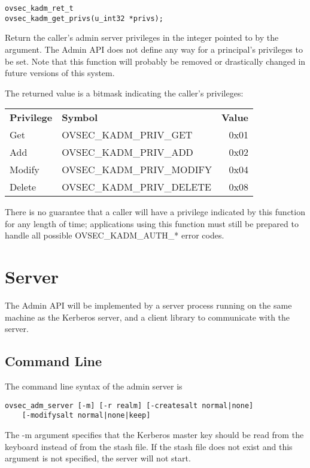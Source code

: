 \begin{verbatim}
ovsec_kadm_ret_t
ovsec_kadm_get_privs(u_int32 *privs);
\end{verbatim}

Return the caller's admin server privileges in the integer pointed to
by the argument.  The Admin API does not define any way for a
principal's privileges to be set.  Note that this function will
probably be removed or drastically changed in future versions of this
system.

The returned value is a bitmask indicating the caller's privileges:

\begin{tabular}{llr}
{\bf Privilege} & {\bf Symbol} & {\bf Value} \\
Get & OVSEC_KADM_PRIV_GET & 0x01 \\
Add & OVSEC_KADM_PRIV_ADD & 0x02 \\
Modify & OVSEC_KADM_PRIV_MODIFY & 0x04 \\
Delete & OVSEC_KADM_PRIV_DELETE & 0x08
\end{tabular}

There is no guarantee that a caller will have a privilege indicated by
this function for any length of time; applications using this function
must still be prepared to handle all possible OVSEC_KADM_AUTH_* error
codes.

\section{Server}

The Admin API will be implemented by a server process running on the
same machine as the Kerberos server, and a client library to
communicate with the server.

\subsection{Command Line}
\label{sec:commandline}

The command line syntax of the admin server is

\begin{verbatim}
ovsec_adm_server [-m] [-r realm] [-createsalt normal|none]
	[-modifysalt normal|none|keep] 
\end{verbatim}

The -m argument specifies that the Kerberos master key should be read
from the keyboard instead of from the stash file.  If the stash file
does not exist and this argument is not specified, the server will
not start.

